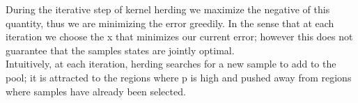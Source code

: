 During the iterative step of kernel herding we maximize the negative of this quantity, thus we are minimizing the error greedily. In the sense that at each iteration we choose the x that minimizes our current error; however this does not guarantee that the samples states are jointly optimal.
\\
Intuitively, at each iteration, herding searches for a new sample to add to the pool; it is attracted to the regions where p is high and pushed away from regions where samples have already been selected.
\\
